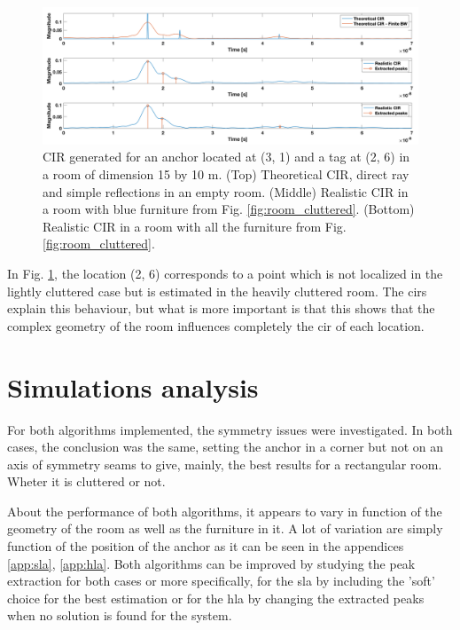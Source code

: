 \begin{figure}[H]
\centering
\includegraphics[width=.9\linewidth]{Images/image_1.png}
\caption{CIR generated for an anchor located at (3, 1) and a tag at (2, 6) in a room of dimension 15 by 10 m. (Top) Theoretical CIR, direct ray and simple reflections in an empty room. (Middle) Realistic CIR in a room with blue furniture from Fig. \ref{fig:room_cluttered}. (Bottom) Realistic CIR in a room with all the furniture from Fig. \ref{fig:room_cluttered}. \label{fig:cir_hla_1}}
\end{figure}

In Fig. \ref{fig:cir_hla_1}, the location (2, 6) corresponds to a point which is not localized in the lightly cluttered case but is estimated in the heavily cluttered room. The \glspl{cir} explain this behaviour, but what is more important is that this shows that the complex geometry of the room influences completely the \gls{cir} of each location.



\section{Simulations analysis}
\label{simu_anal}

For both algorithms implemented, the symmetry issues were investigated. In both cases, the conclusion was the same, setting the anchor in a corner but not on an axis of symmetry seams to give, mainly, the best results for a rectangular room. Wheter it is cluttered or not.
\vspace{2mm}

About the performance of both algorithms, it appears to vary in function of the geometry of the room as well as the furniture in it. A lot of variation are simply function of the position of the anchor as it can be seen in the appendices \ref{app:sla}, \ref{app:hla}. Both algorithms can be improved by studying the peak extraction for both cases or more specifically, for the \gls{sla} by including the 'soft' choice for the best estimation or for the \gls{hla} by changing the extracted peaks when no solution is found for the system.


